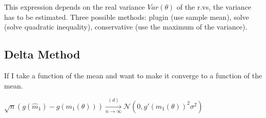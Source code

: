 This expression depends on the real variance $Var(\theta)$ of the r.vs, the variance has to be estimated. Three possible methods: plugin (use sample mean), solve (solve quadratic inequality), conservative (use the maximum of the variance).\\

\subsection*{Delta Method}

If I take a function of the mean and want to make it converge to a function of the mean. 

$\sqrt{n}(g(\widehat{m}_1) - g(m_1(\theta ))) \xrightarrow [n \to \infty ]{(d)} \mathcal{N}(0, g'(m_1(\theta ))^2 \sigma ^2)$

